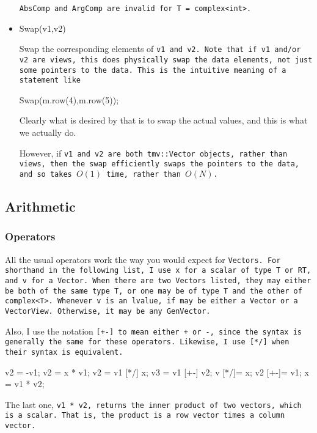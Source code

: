 \begin{itemize}
\tt{AbsComp} and \tt{ArgComp} are invalid for \tt{T = complex<int>}.

\item
\begin{tmvcode}
Swap(v1,v2)
\end{tmvcode}
Swap the corresponding elements of \tt{v1} and \tt{v2}.  Note that if v1 and/or v2 are
views, this does physically
swap the data elements, not just some pointers to the data.  This is the intuitive 
meaning of a statement like
\begin{tmvcode}
Swap(m.row(4),m.row(5));
\end{tmvcode}
Clearly what is desired by that is to swap the actual values, and this is what we actually do.

However, if \tt{v1} and \tt{v2} are both \tt{tmv::Vector} objects, rather than views, then the 
swap efficiently swaps the pointers to the data, and so takes $O(1)$ time, rather than
$O(N)$.

\end{itemize}

\subsection{Arithmetic}
\label{Vector_Arithmetic}

\subsubsection{Operators}

All the usual operators work the way you would expect for \tt{Vector}s.  For shorthand in the 
following list, I use \tt{x} for a scalar of type \tt{T} or \tt{RT}, and
\tt{v} for a \tt{Vector}.  When there are two \tt{Vector}s
listed, they may either be both of the same type \tt{T}, or one may be of type 
\tt{T} and the other of \tt{complex<T>}.  Whenever \tt{v} is an lvalue,
if may be either a \tt{Vector} or a \tt{VectorView}.  Otherwise, it may be any \tt{GenVector}.

Also, I use the notation \tt{[+-]} to mean either \tt{+} or \tt{-}, since
the syntax is generally the same for these operators.
Likewise, I use \tt{[*/]} when their syntax is equivalent.

\begin{tmvcode}
v2 = -v1;
v2 = x * v1;
v2 = v1 [*/] x;
v3 = v1 [+-] v2;
v [*/]= x;
v2 [+-]= v1;
x = v1 * v2;
\end{tmvcode}
The last one, \tt{v1 * v2},
returns the inner product of two vectors, which is a scalar.  That is, the product
is a row vector times a column vector.  

